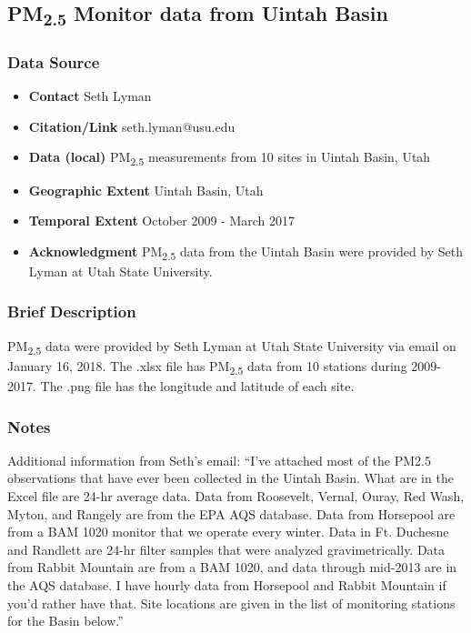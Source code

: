\subsection{\texorpdfstring{PM\textsubscript{2.5}}{} Monitor data from Uintah Basin}

\subsubsection*{Data Source}

\begin{itemize}[nolistsep]
\item \textbf{Contact} Seth Lyman 
\item \textbf{Citation/Link} seth.lyman@usu.edu
\item \textbf{Data (local)} PM\textsubscript{2.5} measurements from 10 sites in Uintah Basin, Utah
\item \textbf{Geographic Extent} Uintah Basin, Utah
\item \textbf{Temporal Extent} October 2009 - March 2017
\item \textbf{Acknowledgment} PM\textsubscript{2.5} data from the Uintah Basin were provided by Seth Lyman at Utah State University.
\end{itemize}

\subsubsection*{Brief Description}

PM\textsubscript{2.5} data were provided by Seth Lyman at Utah State University via email on January 16, 2018. The .xlsx file has PM\textsubscript{2.5} data from 10 stations during 2009-2017. The .png file has the longitude and latitude of each site. 

\subsubsection*{Notes}
Additional information from Seth's email: \newline
``I’ve attached most of the PM2.5 observations that have ever been collected in the Uintah Basin.  What are in the Excel file are 24-hr average data.  Data from Roosevelt, Vernal, Ouray, Red Wash, Myton, and Rangely are from the EPA AQS database. \newline Data from Horsepool are from a BAM 1020 monitor that we operate every winter.  Data in Ft. Duchesne and Randlett are 24-hr filter samples that were analyzed gravimetrically.  Data from Rabbit Mountain are from a BAM 1020, and data through mid-2013 are in the AQS database. \newline \newline
\noindent I have hourly data from Horsepool and Rabbit Mountain if you’d rather have that. \newline \newline
\noindent Site locations are given in the list of monitoring stations for the Basin below.'' \newline

